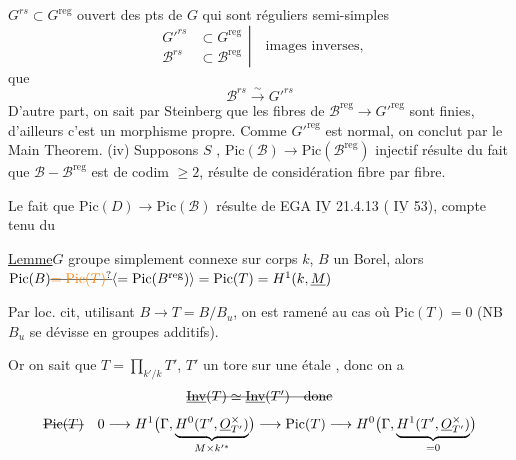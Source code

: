 $G^{rs}\subset G^{\mathrm{reg}}$ ouvert des pts de $G$ qui sont réguliers semi-simples
\[
\left.\begin{aligned}
G'^{rs}&\subset G^{\mathrm{reg}}\\
\mathscr B^{rs}&\subset\mathscr B^{\mathrm{reg}}
\end{aligned}\right|\quad\text{images inverses,}
\]
que
\[
\mathscr B^{rs}\xrightarrow{\sim} G'^{rs}
\]
D'autre part, on sait par Steinberg que les fibres de $\mathscr B^{\mathrm{reg}}\longrightarrow G'^{\mathrm{reg}}$ sont finies, d'ailleurs c'est un morphisme propre. Comme $G'^{\mathrm{reg}}$ est normal, on conclut par le Main Theorem.
(iv) Supposons  $S$ ,   $\mathrm{Pic}(\mathscr B)\longrightarrow\mathrm{Pic}(\mathscr B^{\mathrm{reg}})$ injectif résulte  du fait que $\mathscr B-\mathscr B^{\mathrm{reg}}$ est de codim $\geq 2$,   résulte de considération fibre par fibre.

Le fait que $\mathrm{Pic}(D)\longrightarrow\mathrm{Pic}(\mathscr B)$  résulte de EGA $\underline{\mathrm{IV}}$ 21.4.13 ( $\underline{\mathrm{IV}}$ 53), compte tenu du

\uline{Lemme}\quad $G$ groupe  simplement connexe sur corps $k$, $B$ un Borel, alors $\mathrm{Pic}(B)\deleted{\unsure{=\mathrm{Pic}(T)}}\inserted{=\mathrm{Pic}(B^{\mathrm{reg}})}=\mathrm{Pic}(T)=H^1(k,\underline M)$  

Par loc. cit, utilisant  $B\longrightarrow T=B/B_u$, on est ramené au cas où $\mathrm{Pic}(T)=0$ (NB $B_u$ se dévisse en groupes additifs).


Or on sait que $T=\prod_{k'/k} T'$, $T'$ un tore sur une  étale , donc on a 
\[
\deleted{\underline{\mathrm{Inv}}(T)\simeq\underline{\mathrm{Inv}}(T')\quad\text{donc}}
\]
\[
\deleted{\mathrm{Pic}(T)}\quad
0\longrightarrow H^1\bigl(\Gamma,\underbrace{H^0(T',\underline O_{T'}^{\times})}_{M\times k'^{*}}\bigr)
\longrightarrow\mathrm{Pic}(T)\longrightarrow H^0\bigl(\Gamma,\underbrace{H^1(T',\underline O_{T'}^{\times})}_{=0}\bigr)
\]

